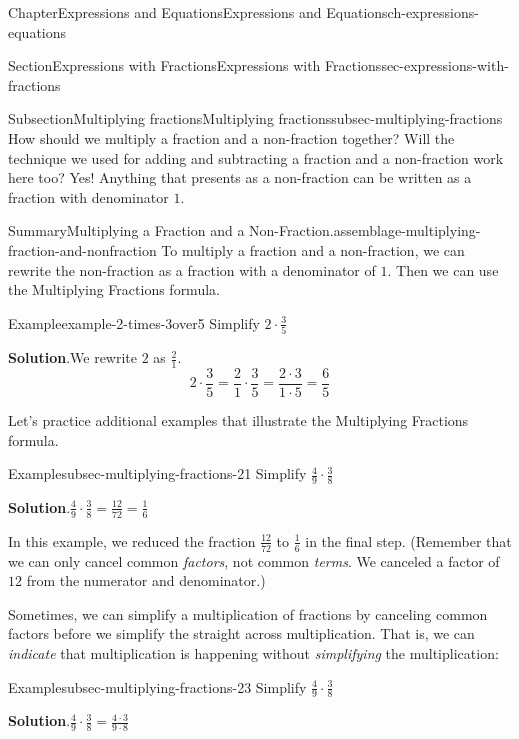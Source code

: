 \documentclass[twoside,11pt,]{book}
\newcommand{\blocktitlefont}{\relax}
\numberwithin{equation}{chapter}
\begin{document}
\begin{chapterptx}{Chapter}{Expressions and Equations}{}{Expressions and Equations}{}{}{ch-expressions-equations}
\begin{sectionptx}{Section}{Expressions with Fractions}{}{Expressions with Fractions}{}{}{sec-expressions-with-fractions}
\begin{subsectionptx}{Subsection}{Multiplying fractions}{}{Multiplying fractions}{}{}{subsec-multiplying-fractions}
How should we multiply a fraction and a non-fraction together? Will the technique we used for adding and subtracting a fraction and a non-fraction work here too? Yes! Anything that presents as a non-fraction can be written as a fraction with denominator \(1\).%
\begin{assemblage}{Summary}{Multiplying a Fraction and a Non-Fraction.}{assemblage-multiplying-fraction-and-nonfraction}%
To multiply a fraction and a non-fraction, we can rewrite the non-fraction as a fraction with a denominator of \(1\). Then we can use the Multiplying Fractions formula.%
\end{assemblage}
\begin{example}{Example}{}{example-2-times-3over5}%
Simplify \(2 \cdot \frac{3}{5}\)%
\par\smallskip%
\noindent\textbf{\blocktitlefont Solution}.\hypertarget{example-2-times-3over5-2}{}\quad{}We rewrite \(2\) as \(\frac{2}{1}\).%
\begin{equation*}
2 \cdot \frac{3}{5} = \frac{2}{1} \cdot \frac{3}{5} = \frac{2 \cdot 3}{1 \cdot 5} = \frac{6}{5}
\end{equation*}
%
\end{example}
Let's practice additional examples that illustrate the Multiplying Fractions formula.%
\begin{example}{Example}{}{subsec-multiplying-fractions-21}%
Simplify \(\frac{4}{9} \cdot \frac{3}{8}\)%
\par\smallskip%
\noindent\textbf{\blocktitlefont Solution}.\hypertarget{subsec-multiplying-fractions-21-2}{}\quad{}\(\frac{4}{9} \cdot \frac{3}{8} = \frac{12}{72} = \frac{1}{6}\)%
\par
In this example, we reduced the fraction \(\frac{12}{72}\) to \(\frac{1}{6}\) in the final step. (Remember that we can only cancel common \emph{factors}, not common \emph{terms}. We canceled a factor of \(12\) from the numerator and denominator.)%
\end{example}
Sometimes, we can simplify a multiplication of fractions by canceling common factors before we simplify the straight across multiplication. That is, we can \emph{indicate} that multiplication is happening without \emph{simplifying} the multiplication:%
\begin{example}{Example}{}{subsec-multiplying-fractions-23}%
Simplify \(\frac{4}{9} \cdot \frac{3}{8}\)%
\par\smallskip%
\noindent\textbf{\blocktitlefont Solution}.\hypertarget{subsec-multiplying-fractions-23-2}{}\quad{}\(\frac{4}{9} \cdot \frac{3}{8} = \frac{4 \cdot 3}{9 \cdot 8}\)%

\end{example}
\end{subsectionptx}
\end{sectionptx}
\end{chapterptx}
\end{document}
